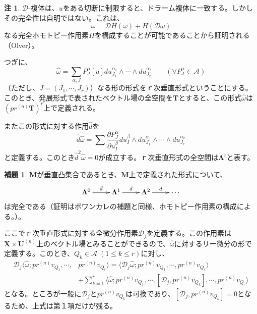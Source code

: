 \documentclass[a4paper, 11pt]{report}
\theoremstyle{definition}
\newtheorem{lemma}{補題}[section]
\newtheorem*{remark*}{注}
\begin{document}
\begin{remark*}
 $\mathcal{D}$-複体は、$u$をある切断に制限すると、ドラーム複体に一致する。しかしその完全性は自明ではない。これは、
\begin{equation*}
\omega = \mathcal{D}H(\omega) + H(\mathcal{D}\omega)
\end{equation*}
なる完全ホモトピー作用素$H$を構成することが可能であることから証明される（Olver\cite[Chap.5]{Olver4}）。
\end{remark*}

 つぎに、
\begin{equation}
\hat{\omega} = \sum _{\alpha,J} P^\alpha_J[u]du^{\alpha_1}_{J_1}\wedge \cdots \wedge du^{\alpha_r}_{J_r} \qquad (\forall P^\alpha_J\in \mathcal{A}) %
\end{equation}
（ただし、$J=(J_1,\cdots,J_r)$）なる形の形式をｒ次垂直形式ということにする。このとき、発展形式で表されたベクトル場の全空間を$\mathbf{T}$とすると、この形式$\hat{\omega}$は$(pr^{(n)}\mathbf{T})^r$上で定義される。

 またこの形式に対する作用$\hat{d}$を
\begin{equation*}
\hat{d} \hat{\omega} = \sum \frac{\partial P^\alpha_J}{\partial u^\beta_I} du^\beta_I \wedge du^{\alpha_1}_{J_1}\wedge \cdots \wedge du^{\alpha_r}_{J_r}
\end{equation*}
と定義する。このとき$\hat{d}^2\hat{\omega}=0$が成立する。ｒ次垂直形式の全空間は$\mathbf{\Lambda}^r$と表す。

\begin{lemma}
 $\mathbf{M}$が垂直凸集合であるとき、$\mathbf{M}$上で定義された形式について、
\begin{align*}
\xymatrix{
\mathbf{\Lambda}^0 \ar[r]^{\hat{d}} &\mathbf{\Lambda}^1 \ar[r]^{\hat{d}} &\mathbf{\Lambda}^2 \ar[r]^{\hat{d}} &{\cdots}
}
\end{align*}
は完全である（証明はポワンカレの補題と同様、ホモトピー作用素の構成による。）。
\end{lemma}

 ここでｒ次垂直形式に対する全微分作用素$\mathcal{D}_j$を定義する。この作用素は$\mathbf{X}\times \mathbf{U}^{(n)}$上のベクトル場とみることができるので、$\hat{\omega}$に対するリー微分の形で定義する。このとき、$Q_k\in \mathcal{A}\; (1\leq k\leq r)$に対し、
\begin{align*}
\mathcal{D}_j \langle \hat{\omega}; pr^{(n)}v_{Q_1}, \cdots, &pr^{(n)}v_{Q_r} \rangle = \langle \mathcal{D}_j\hat{\omega}; pr^{(n)}v_{Q_1}, \cdots, pr^{(n)}v_{Q_r} \rangle \\
&+ \sum_{k=1}^r \langle \hat{\omega}; pr^{(n)}v_{Q_1}, \cdots, [\mathcal{D}_j, pr^{(n)}v_{Q_k}], \cdots, pr^{(n)}v_{Q_r} \rangle
\end{align*}
となる。ところが一般に$\mathcal{D}_j$と$pr^{(n)}v_{Q_k}$は可換であり、$[\mathcal{D}_j, pr^{(n)}v_{Q_k}]=0$となるため、上式は第１項だけが残る。
\end{document}
